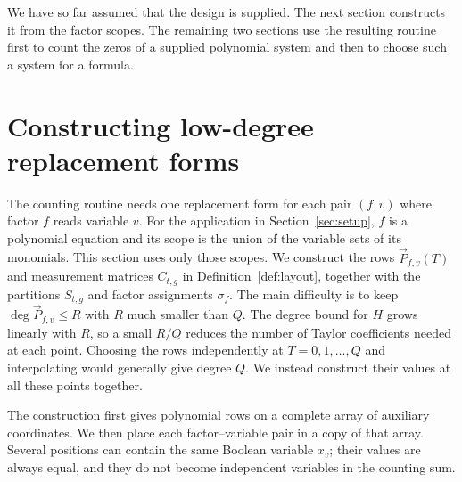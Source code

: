 \documentclass[11pt,reqno]{amsart}
\numberwithin{equation}{section}
\theoremstyle{definition}\newtheorem{definition}[theorem]{Definition}
\theoremstyle{remark}\newtheorem{remark}[theorem]{Remark}
\renewcommand{\le}{\leqslant}
\begin{document}
We have so far assumed that the design is supplied. The next
section constructs it from the factor scopes. The remaining
two sections use the resulting routine first to count the zeros of a
supplied polynomial system and then to choose such a system for a formula.

\section{Constructing low-degree replacement forms}\label{sec:construction}
The counting routine needs one replacement form for each pair $(f,v)$
where factor $f$ reads variable $v$. For the application in
Section~\ref{sec:setup}, $f$ is a polynomial equation and its scope is
the union of the variable sets of its monomials. This section uses
only those scopes.
We construct the rows $\vec{P}_{f,v}(T)$ and measurement matrices $C_{t,g}$
in Definition~\ref{def:layout}, together with the partitions $S_{t,g}$
and factor assignments $\sigma_f$. The main difficulty is to keep
$\deg \vec{P}_{f,v}\le R$ with $R$ much smaller than $Q$. The degree bound
for $H$ grows linearly with $R$, so a small $R/Q$ reduces the number
of Taylor coefficients needed at each point. Choosing the rows
independently at $T=0,1,\ldots,Q$ and interpolating would generally give
degree $Q$. We instead construct their values at all these points together.

The construction first gives polynomial rows on a complete array of
auxiliary coordinates. We then place each factor--variable pair in a
copy of that array. Several positions can contain the same Boolean
variable $x_v$; their values are always equal, and they do not become
independent variables in the counting sum.
\end{document}
